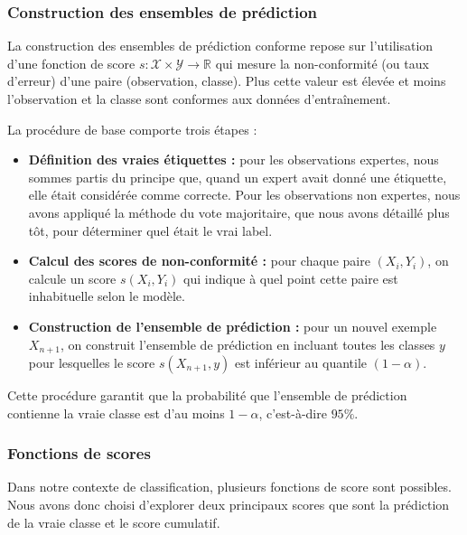 \documentclass[a4paper,12pt]{article}
\begin{document}
\subsubsection{Construction des ensembles de prédiction}

La construction des ensembles de prédiction conforme repose sur l'utilisation d'une fonction de score $s : \mathcal{X} \times \mathcal{Y} \rightarrow \mathbb{R}$ qui mesure la non-conformité (ou taux d'erreur) d'une paire (observation, classe). Plus cette valeur est élevée et moins l'observation et la classe sont conformes aux données d'entraînement.

\vspace{0.2cm}

La procédure de base comporte trois étapes : 
\begin{itemize}
    \item \textbf{Définition des vraies étiquettes :} pour les observations expertes, nous sommes partis du principe que, quand un expert avait donné une étiquette, elle était considérée comme correcte. Pour les observations non expertes, nous avons appliqué la méthode du vote majoritaire, que nous avons détaillé plus tôt, pour déterminer quel était le vrai label.
    \item \textbf{Calcul des scores de non-conformité :} pour chaque paire $(X_i, Y_i)$, on calcule un score $s(X_i, Y_i)$ qui indique à quel point cette paire est inhabituelle selon le modèle.
    \item \textbf{Construction de l'ensemble de prédiction :} pour un nouvel exemple $X_{n+1}$, on construit l'ensemble de prédiction en incluant toutes les classes $y$ pour lesquelles le score $s(X_{n+1}, y)$ est inférieur au quantile $(1- \alpha)$.
\end{itemize}

\vspace{0.2cm}

Cette procédure garantit que la probabilité que l'ensemble de prédiction contienne la vraie classe est d'au moins $1- \alpha$, c'est-à-dire $95\%$.

\subsubsection{Fonctions de scores}

Dans notre contexte de classification, plusieurs fonctions de score sont possibles. Nous avons donc choisi d'explorer deux principaux scores que sont la prédiction de la vraie classe et le score cumulatif.
\end{document}
